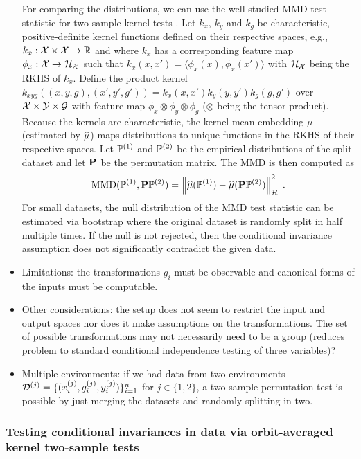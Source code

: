 \begin{itemize}
For comparing the distributions, we can use the well-studied MMD test statistic for two-sample kernel tests \parencite{Gretton:2012}. Let $k_x$, $k_y$ and $k_g$ be characteristic, positive-definite kernel functions defined on their respective spaces, e.g., $k_x:\mathcal{X}\times\mathcal{X}\rightarrow\mathbb{R}$ and where $k_x$ has a corresponding feature map $\phi_x:\mathcal{X}\rightarrow\mathcal{H}_{\mathcal{X}}$ such that $k_x(x,x')=\langle\phi_x(x),\phi_x(x')\rangle$ with $\mathcal{H}_{\mathcal{X}}$ being the RKHS of $k_x$. Define the product kernel $k_{xyg}((x,y,g),(x',y',g'))=k_x(x,x')k_y(y,y')k_g(g,g')$ over $\mathcal{X}\times\mathcal{Y}\times\mathcal{G}$ with feature map $\phi_x\otimes\phi_y\otimes\phi_g$ ($\otimes$ being the tensor product). Because the kernels are characteristic, the kernel mean embedding $\mu$ (estimated by $\widehat{\mu}$) maps distributions to unique functions in the RKHS of their respective spaces. Let $\mathbb{P}^{(1)}$ and $\mathbb{P}^{(2)}$ be the empirical distributions of the split dataset and let $\mathbf{P}$ be the permutation matrix. The MMD is then computed as
\[
\mathrm{MMD}(\mathbb{P}^{(1)},\mathbf{P}\mathbb{P}^{(2)}) = \left\|\widehat{\mu}(\mathbb{P}^{(1)})-\widehat{\mu}(\mathbf{P}\mathbb{P}^{(2)})\right\|_{\mathcal{H}}^2\;.
\]
For small datasets, the null distribution of the MMD test statistic can be estimated via bootstrap where the original dataset is randomly split in half multiple times. If the null is not rejected, then the conditional invariance assumption does not significantly contradict the given data.

\item
Limitations: the transformations $g_i$ must be observable and canonical forms of the inputs must be computable.

\item
Other considerations: the setup does not seem to restrict the input and output spaces nor does it make assumptions on the transformations. The set of possible transformations may not necessarily need to be a group (reduces problem to standard conditional independence testing of three variables)?

\item
Multiple environments: if we had data from two environments $\mathcal{D}^{(j)}=\{(x_i^{(j)},g_i^{(j)},y_i^{(j)})\}_{i=1}^n$ for $j\in\{1,2\}$, a two-sample permutation test is possible by just merging the datasets and randomly splitting in two.

\end{itemize}

\subsubsection{Testing conditional invariances in data via orbit-averaged kernel two-sample tests}

